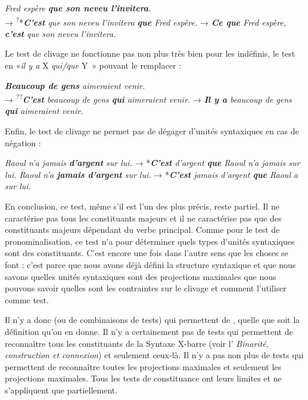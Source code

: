 {    \ea
        \textit{{Fred espère} \textbf{{que son neveu l’invitera}}.}\\  
        \textrm{→}  \textsuperscript{?}{*}\textit{\textbf{{C’est}}  {que son neveu l’invitera} \textbf{{que}}  {Fred espère.}}
        \textrm{→} \textit{\textbf{{Ce que}}  {Fred espère,} \textbf{{c’est}} {que son neveu l’invitera.}}\\
    \z

    Le test de clivage ne fonctionne pas non plus très bien pour les indéfinis, le test en «\textit{il y a} X \textit{qui/que} Y~» pouvant le remplacer :

    \ea
        \textit{\textbf{{Beaucoup de gens}}  {aimeraient venir.}}\\     
        \textrm{→}    \textsuperscript{??}\textit{\textbf{{C’est}}  {beaucoup de gens} \textbf{{qui}}  {aimeraient venir.}}
        \textrm{→}    \textit{\textbf{{Il y a}}  {beaucoup de gens} \textbf{{qui}}  {aimeraient venir.}}\\
    \z

    Enfin, le test de clivage ne permet pas de dégager d’unités syntaxiques en cas de négation :

    \ea
    \ea         \textit{{Raoul n’a}  {jamais} \textbf{{d’argent}} {sur lui.}} \textrm{→}  *\textit{\textbf{{C’est}} {d’argent} \textbf{{que}}  {Raoul n’a} {jamais sur lui.}}
    \ex         \textit{{Raoul n’a} \textbf{{jamais d’argent}}  {sur lui.}} \textrm{→}  *\textit{\textbf{{C’est}} {jamais d’argent} \textbf{{que}}  {Raoul a sur lui.}}
    \z
    \z

    En conclusion, ce test, même s’il est l’un des plus précis, reste partiel. Il ne caractérise pas tous les constituants majeurs et il ne caractérise pas que des constituants majeurs dépendant du verbe principal. Comme pour le test de pronominalisation, ce test n’a  pour déterminer quels types d’unités syntaxiques sont des constituants. C’est encore une fois dans l’autre sens que les choses se font : c’est parce que nous avons déjà défini la structure syntaxique et que nous savons quelles unités syntaxiques sont des projections maximales que nous pouvons savoir quelles sont les contraintes sur le clivage et comment l’utiliser comme test.

    Il n’y a donc  (ou de combinaisons de tests) qui permettent de , quelle que soit la définition qu’on en donne. Il n’y a certainement pas de tests qui permettent de reconnaître tous les constituants de la Syntaxe X-barre (voir l' \textit{Binarité, construction et connexion}) et seulement ceux-là. Il n’y a pas non plus de tests qui permettent de reconnaître toutes les projections maximales et seulement les projections maximales. Tous les tests de constituance ont leurs limites et ne s’appliquent que partiellement.

}
